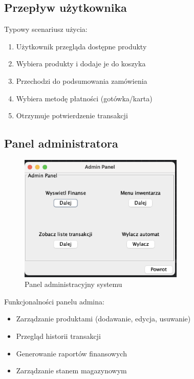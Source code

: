 \subsection{Przepływ użytkownika}
Typowy scenariusz użycia:
\begin{enumerate}
\item Użytkownik przegląda dostępne produkty
\item Wybiera produkty i dodaje je do koszyka
\item Przechodzi do podsumowania zamówienia
\item Wybiera metodę płatności (gotówka/karta)
\item Otrzymuje potwierdzenie transakcji
\end{enumerate}

\subsection{Panel administratora}
\begin{figure}[H]
\centering
\includegraphics[width=0.7\textwidth]{figures/admin_panel.png}
\caption{Panel administracyjny systemu}
\label{fig:admin_panel}
\end{figure}

Funkcjonalności panelu admina:
\begin{itemize}
\item Zarządzanie produktami (dodawanie, edycja, usuwanie)
\item Przegląd historii transakcji
\item Generowanie raportów finansowych
\item Zarządzanie stanem magazynowym
\end{itemize}